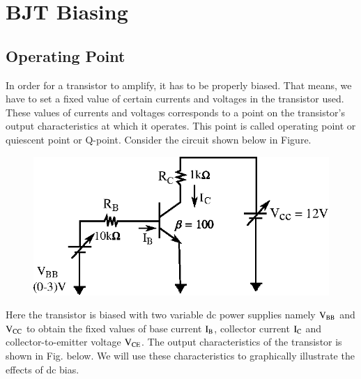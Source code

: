 \makeatletter
\def\@makechapterhead#1{%
  \vspace*{10\p@}%
  {\parindent \z@ \raggedleft \normalfont
    \ifnum \c@secnumdepth >\m@ne
      \if@mainmatter
        \LARGE\bfseries \@chapapp\space \thechapter
	\vskip 4pt
        \hrule height 2pt
        \par\nobreak
        \vskip 5\p@
      \fi
    \fi
    \interlinepenalty\@M
    \huge \bfseries #1\par\nobreak
\vskip 5pt

\hrule height 2pt   
 \vskip 10\p@  
  }}
\makeatother

\chapter{BJT Biasing}\label{chap3}

\medskip
\section{Operating Point}\label{sec3.1}

In order for a transistor to amplify, it has to be properly biased. That means, we have to set a fixed value of certain currents and voltages in the transistor used. These values of currents and voltages corresponds to a point on the transistor's output characteristics at which it operates. This point is called operating point or quiescent point or Q-point. Consider the circuit shown below in Figure.
\begin{figure}[H]
\centering
\includegraphics{chap3/fig3.1.eps}
\end{figure}

Here the transistor is biased with two variable dc power supplies namely $\textrm{V}_{\textrm{B}\textrm{B}}$ and $\textrm{V}_{\textrm{C}\textrm{C}}$ to obtain the fixed values of base current $\textrm{I}_{\textrm{B}}$, collector current $\textrm{I}_{\textrm{C}}$ and collector-to-emitter voltage $\textrm{V}_{\textrm{C}\textrm{E}}$. The output characteristics of the transistor is shown in Fig. below. We will use these characteristics to graphically illustrate the effects of dc bias.

